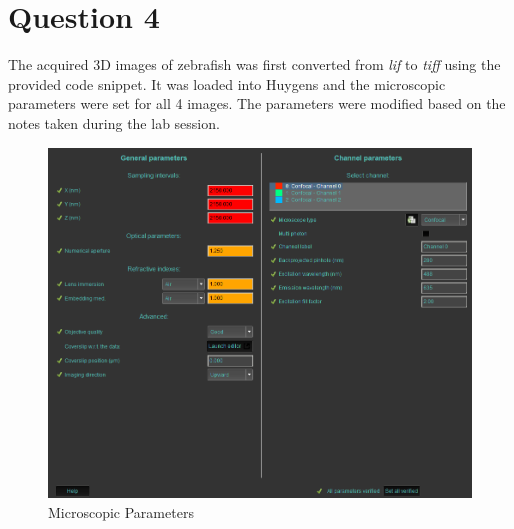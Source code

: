 \documentclass{article}
\begin{document}
\clearpage
\section*{Question 4}
The acquired 3D images of zebrafish was first converted from  \textit{lif} to \textit{tiff} using the provided code snippet. It was loaded into Huygens and the microscopic parameters were set for all 4 images. 
The parameters were modified based on the notes taken during the lab session. 
\begin{figure}[h!]
    \centering
    \includegraphics[width=0.75\linewidth]{Report/Images/parameters_set.png}
    \caption{Microscopic Parameters}
    \label{fig:microscope-parameters}
\end{figure}
\end{document}
